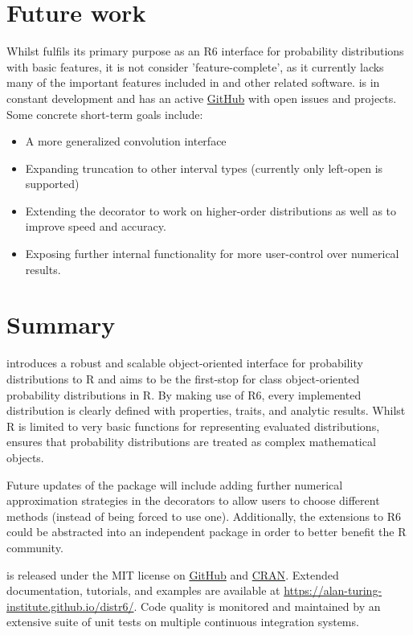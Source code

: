 \section{Future work}
Whilst  fulfils its primary purpose as an R6 interface for probability distributions with basic features, it is not consider 'feature-complete', as it currently lacks many of the important features included in  and other related software.  is in constant development and has an active \href{https://github.com/alan-turing-institute/distr6}{GitHub} with open issues and projects. Some concrete short-term goals include:
\begin{itemize}
\itemsep-0.2em
\item A more generalized convolution interface
\item Expanding truncation to other interval types (currently only left-open is supported)
\item Extending the  decorator to work on higher-order distributions as well as to improve speed and accuracy.
\item Exposing further internal functionality for more user-control over numerical results.
\end{itemize}

\section{Summary}
 introduces a robust and scalable object-oriented interface for probability distributions to R and aims to be the first-stop for class object-oriented probability distributions in R. By making use of R6, every implemented distribution is clearly defined with properties, traits, and analytic results. Whilst R  is limited to very basic  functions for representing evaluated distributions,  ensures that probability distributions are treated as complex mathematical objects.

Future updates of the package will include adding further numerical approximation strategies in the decorators to allow users to choose different methods (instead of being forced to use one). Additionally, the extensions to R6 could be abstracted into an independent package in order to better benefit the R community.

 is released under the MIT license on \href{https://github.com/alan-turing-institute/distr6}{GitHub} and \href{https://CRAN.R-project.org/package=distr6}{CRAN}. Extended documentation, tutorials, and examples are available at \url{https://alan-turing-institute.github.io/distr6/}. Code quality is monitored and maintained by an extensive suite of unit tests on multiple continuous integration systems.

